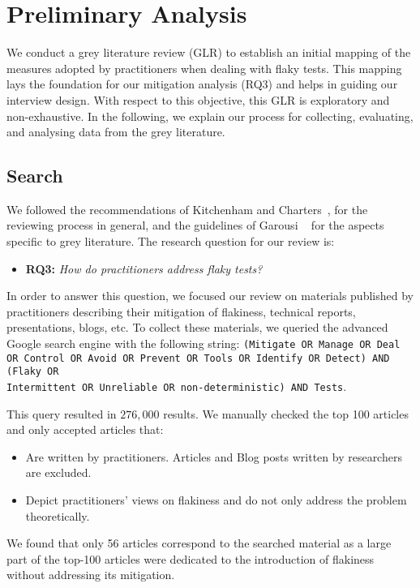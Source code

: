 \section{Preliminary Analysis}
\label{sec:survey-preliminary}

We conduct a grey literature review (GLR) to establish an initial mapping of the measures adopted by practitioners when dealing with flaky tests.
This mapping lays the foundation for our mitigation analysis (RQ3) and helps in guiding our interview design.
With respect to this objective, this GLR is exploratory and non-exhaustive.  
In the following, we explain our process for collecting, evaluating, and analysing data from the grey literature.
\subsection{Search}
We followed the recommendations of Kitchenham and Charters~\cite{kit_cha_2007}, for the reviewing process in general, and the guidelines of Garousi \etal~\cite{garousi2019guidelines} for the aspects specific to grey literature.
The research question for our review is:
\begin{itemize}[label={}]
\item \textbf{\textsc{RQ3:}} \emph{How do practitioners address flaky tests?}
\end{itemize}
In order to answer this question, we focused our review on materials published by practitioners describing their mitigation of flakiness, \eg technical reports, presentations, blogs, etc.
To collect these materials, we queried the advanced Google search engine with the following string:
\texttt{(Mitigate OR Manage OR Deal OR Control OR Avoid OR Prevent OR Tools OR Identify OR Detect) AND (Flaky OR \\ Intermittent OR Unreliable OR non-deterministic) AND Tests}.

This query resulted in $276,000$ results.
We manually checked the top 100 articles and only accepted articles that:
\begin{itemize}
    \item Are written by practitioners. Articles and Blog posts written by researchers are excluded.
    \item Depict practitioners' views on flakiness and do not only address the problem theoretically.
\end{itemize}
We found that only 56 articles correspond to the searched material as a large part of the top-100 articles were dedicated to the introduction of flakiness without addressing its mitigation.

